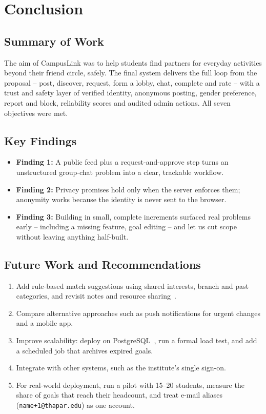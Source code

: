 \documentclass[twoside,12pt]{tietreport}
\begin{document}
\chapter{Conclusion}

\section{Summary of Work}

The aim of CampusLink was to help students find partners for everyday activities
beyond their friend circle, safely. The final system delivers the full loop from
the proposal -- post, discover, request, form a lobby, chat, complete and rate --
with a trust and safety layer of verified identity, anonymous posting, gender
preference, report and block, reliability scores and audited admin actions. All
seven objectives were met.

\section{Key Findings}

\begin{itemize}
  \item \textbf{Finding 1:} A public feed plus a request-and-approve step turns an
    unstructured group-chat problem into a clear, trackable workflow.
  \item \textbf{Finding 2:} Privacy promises hold only when the server enforces
    them; anonymity works because the identity is never sent to the browser.
  \item \textbf{Finding 3:} Building in small, complete increments surfaced real
    problems early -- including a missing feature, goal editing -- and let us cut
    scope without leaving anything half-built.
\end{itemize}

\section{Future Work and Recommendations}

\begin{enumerate}
  \item Add rule-based match suggestions using shared interests, branch and past
    categories, and revisit notes and resource sharing~\cite{sommerville}.
  \item Compare alternative approaches such as push notifications for urgent
    changes and a mobile app.
  \item Improve scalability: deploy on PostgreSQL~\cite{prisma}, run a formal load
    test, and add a scheduled job that archives expired goals.
  \item Integrate with other systems, such as the institute's single sign-on.
  \item For real-world deployment, run a pilot with 15--20 students, measure the
    share of goals that reach their headcount, and treat e-mail aliases
    (\texttt{name+1@thapar.edu}) as one account.
\end{enumerate}
\end{document}
